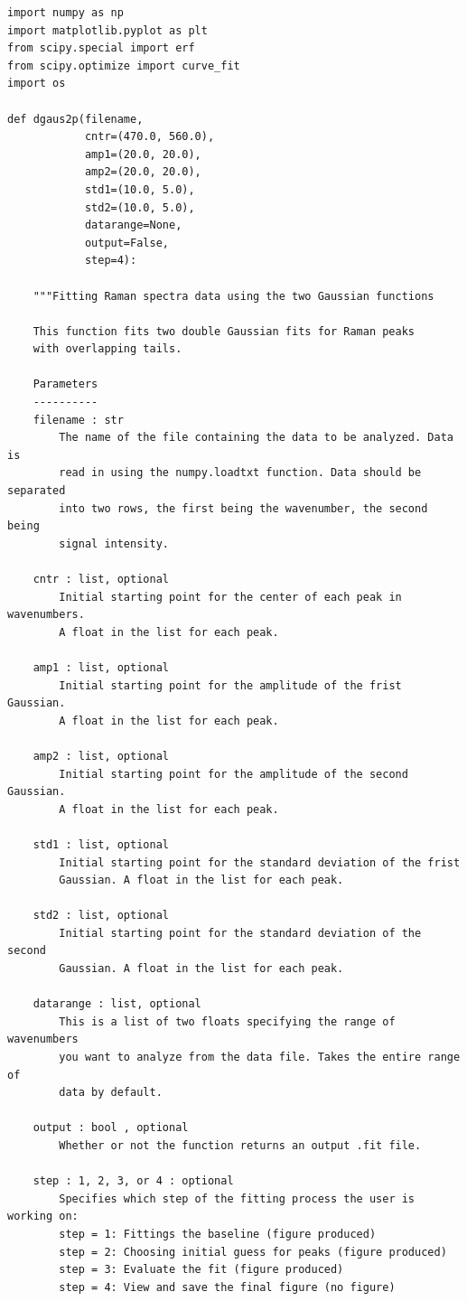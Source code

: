 \documentclass[journal=jpccck,manuscript=suppinfo,email=true]{achemso}
\begin{document}
\begin{verbatim}
import numpy as np
import matplotlib.pyplot as plt
from scipy.special import erf
from scipy.optimize import curve_fit
import os

def dgaus2p(filename,
            cntr=(470.0, 560.0),
            amp1=(20.0, 20.0),
            amp2=(20.0, 20.0),
            std1=(10.0, 5.0),
            std2=(10.0, 5.0),
            datarange=None,
            output=False,
            step=4):

    """Fitting Raman spectra data using the two Gaussian functions

    This function fits two double Gaussian fits for Raman peaks
    with overlapping tails.

    Parameters
    ----------
    filename : str
        The name of the file containing the data to be analyzed. Data is
        read in using the numpy.loadtxt function. Data should be separated
        into two rows, the first being the wavenumber, the second being
        signal intensity.

    cntr : list, optional
        Initial starting point for the center of each peak in wavenumbers.
        A float in the list for each peak.

    amp1 : list, optional
        Initial starting point for the amplitude of the frist Gaussian.
        A float in the list for each peak.

    amp2 : list, optional
        Initial starting point for the amplitude of the second Gaussian.
        A float in the list for each peak.

    std1 : list, optional
        Initial starting point for the standard deviation of the frist
        Gaussian. A float in the list for each peak.

    std2 : list, optional
        Initial starting point for the standard deviation of the second
        Gaussian. A float in the list for each peak.

    datarange : list, optional
        This is a list of two floats specifying the range of wavenumbers
        you want to analyze from the data file. Takes the entire range of
        data by default.

    output : bool , optional
        Whether or not the function returns an output .fit file.

    step : 1, 2, 3, or 4 : optional
        Specifies which step of the fitting process the user is working on:
        step = 1: Fittings the baseline (figure produced)
        step = 2: Choosing initial guess for peaks (figure produced)
        step = 3: Evaluate the fit (figure produced)
        step = 4: View and save the final figure (no figure)



\end{verbatim}
\end{document}
